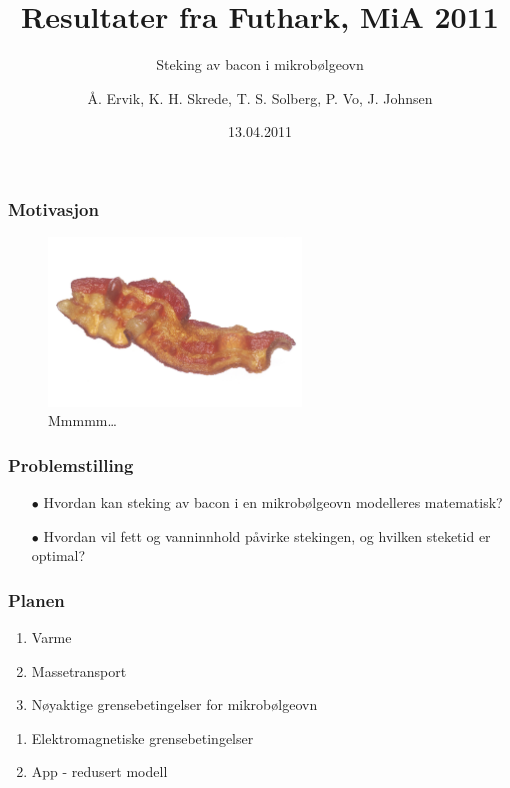 \documentclass[screen]{beamer}
\title[Resultater \wb]{Resultater fra Futhark, MiA 2011}
\subtitle{Steking av bacon i mikrobølgeovn}
\author[Futhark]{Å. Ervik, K. H. Skrede, T. S. Solberg, P. Vo, J. Johnsen}
\institute[NTNU]{Eksperter i Team, NTNU}
\date{13.04.2011}
\newcounter{saveenumi}
\begin{document}
\ntnutitlepage

\begin{frame}
  \frametitle{Motivasjon}
  \begin{center}
  \begin{figure}[!h]
    \begin{center}
      \includegraphics[width=0.6\textwidth]{bacon.png}
    \end{center}
    \caption{Mmmmm\ldots}
  \end{figure}
  \end{center}
\end{frame}

\begin{frame} 
  \frametitle{Problemstilling} 
  \begin{center} 
  \begin{itemize} 
  \item[$\bullet$] Hvordan kan steking av bacon i en mikrobølgeovn modelleres matematisk? 
  \item[$\bullet$] Hvordan vil fett og vanninnhold påvirke stekingen, og hvilken steketid er optimal? 
  \end{itemize} 
  \end{center} 
\end{frame}

\begin{frame}
  \frametitle{Planen}
  \begin{enumerate}
  \item Varme
  \item Massetransport
  \item Nøyaktige grensebetingelser for mikrobølgeovn
    \setcounter{saveenumi}{\theenumi}
\end{enumerate}
    \hline
\begin{enumerate}
    \setcounter{enumi}{\thesaveenumi}
  \item Elektromagnetiske grensebetingelser
  \item App - redusert modell
  \end{enumerate}
\end{frame}
\end{document}
